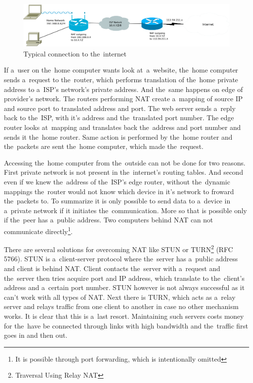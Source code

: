 \begin{figure}[ht]
	\begin{center}
	\includegraphics[width=15cm]{fig/nat-diagram.pdf}
	\caption{Typical connection to the~internet}
	\label{fig:nat-diagram}
\end{center}
\end{figure}

If a~user on the~home computer wants look at~a~website, the~home computer sends a~request to the~router, which performs translation of the~home private address to a~ISP's network's private address. And the~same happens on edge of provider's network. The routers performing NAT create a~mapping of source IP and source port to translated address and port. The web server sends a~reply back to the~ISP, with it's address and the~translated port number. The edge router looks at~mapping and translates back the~address and port number and sends it the~home router. Same action is performed by the~home router and the~packets are sent the~home computer, which made the~request. 

Accessing the~home computer from the~outside can not be done for two reasons. First private network is not present in the~internet's routing tables. And second even if we knew the~address of the~ISP's edge router, without the~dynamic mappings the~router would not know which device in it's network to froward the~packets to. To summarize it is only possible to send data to a~device in a~private network if it initiates the~communication. More so that is possible only if the~peer has a~public address. Two computers behind NAT can not communicate directly\footnote{It is possible through port forwarding, which is intentionally omitted}.  

There are several solutions for overcoming NAT like STUN or TURN\footnote{Traversal Using Relay NAT} (RFC 5766). STUN is a~client-server protocol where the~server has a~public address and client is behind NAT. Client contacts the~server with a~request and the~server then tries acquire port and IP address, which translate to the~client's address and a~certain port number. STUN however is not always successful as it can't work with all types of NAT. Next there is TURN, which acts as a~relay server and relays traffic from one client to another in case no other mechanism works. It is clear that this is a~last resort. Maintaining such servers costs money for the~have be connected through links with high bandwidth and the~traffic first goes in and then out.

